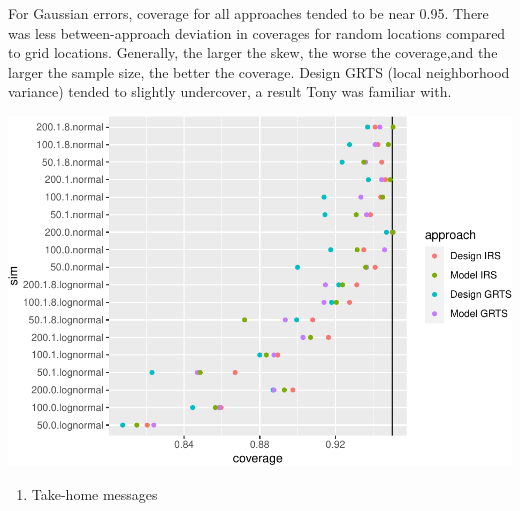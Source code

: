 \documentclass[]{elsarticle} %
\providecommand{\tightlist}{%
  \setlength{\itemsep}{0pt}\setlength{\parskip}{0pt}}
\begin{document}
For Gaussian errors, coverage for all approaches tended to be near 0.95.
There was less between-approach deviation in coverages for random
locations compared to grid locations. Generally, the larger the skew,
the worse the coverage,and the larger the sample size, the better the
coverage. Design GRTS (local neighborhood variance) tended to slightly
undercover, a result Tony was familiar with.

\includegraphics{SpatialDVM_Manuscript_files/figure-latex/unnamed-chunk-8-1.pdf}

\begin{enumerate}
\def\labelenumi{\arabic{enumi}.}
\setcounter{enumi}{4}
\tightlist
\item
  Take-home messages
\end{enumerate}
\end{document}
